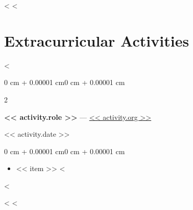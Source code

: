 \documentclass[10pt, letterpaper]{article}
\newenvironment{highlights}{
    \begin{itemize}[
        topsep=0.10 cm,
        parsep=0.10 cm,
        partopsep=0pt,
        itemsep=2pt,
        leftmargin=0 cm + 10pt
    ]
}{
    \end{itemize}
}
\newenvironment{onecolentry}{
    \begin{adjustwidth}{0 cm + 0.00001 cm}{0 cm + 0.00001 cm}
}{
    \end{adjustwidth}
}
\newenvironment{twocolentry}[2][]{
    \onecolentry
    \def\secondColumn{#2}
    \setcolumnwidth{\fill, 4.5 cm}
    \begin{paracol}{2}
}{
    \switchcolumn \raggedleft \secondColumn
    \end{paracol}
    \endonecolentry
}
\begin{document}
    \vspace{0.2cm}

<%
<%


    \section{Extracurricular Activities}

<%
    \begin{twocolentry}{<< activity.date >>}
        \textbf{<< activity.role >>} --- \href{<< activity.org_url >>}{<< activity.org >>}
    \end{twocolentry}

    \vspace{0.10 cm}
    \begin{onecolentry}
        \begin{highlights}
<%
            \item << item >>
<%
        \end{highlights}
    \end{onecolentry}
<%

    \vspace{0.2cm}

<%
<%
\end{document}
